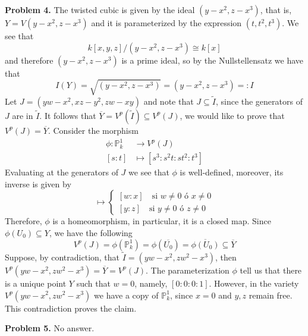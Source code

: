 \documentclass{article}
\def \P {\mathbb{P}}
\begin{document}
\vspace{5mm}
\noindent\textbf{Problem 4.} The twisted cubic is given by the ideal $(y-x^{2},z-x^{3})$, that is,
$Y=V(y-x^{2},z-x^{3})$ and it is parameterized by the expression $(t,t^{2},t^{3})$. We see that
\begin{equation*}
    k[x,y,z]/(y-x^{2},z-x^{3})\cong k[x]
\end{equation*}
and therefore $(y-x^{2},z-x^{3})$ is a prime ideal, so by the Nullstellensatz we have that
\begin{equation*}
    I(Y)=\sqrt{(y-x^{2},z-x^{3})}=(y-x^{2},z-x^{3})=:I
\end{equation*}
Let $J=(yw-x^{2},xz-y^{2},zw-xy)$ and note that $J\subseteq\widetilde{I}$, since the generators of
$J$ are in $\widetilde{I}$. It follows that $\overline{Y}=V^{p}(\widetilde{I})\subseteq V^{p}(J)$,
we would like to prove that $V^{p}(J)=\overline{Y}$. Consider the morphism
\begin{align*}
    \phi:\P_{k}^{1} &\to V^{p}(J) \\
    [s:t] &\mapsto [s^{3}:s^{2}t:st^{2}:t^{3}]
\end{align*}
Evaluating at the generators of $J$ we see that $\phi$ is well-defined, moreover, its inverse is 
given by
\begin{equation*}
    [w:x:y:z]\mapsto\begin{cases}
        [w:x] \quad \text{si $w\neq0$ ó $x\neq0$} \\
        [y:z] \quad \text{si $y\neq0$ ó $z\neq0$}
    \end{cases}
\end{equation*}
Therefore, $\phi$ is a homeomorphism, in particular, it is a closed map. Since 
$\phi(U_{0})\subseteq Y$, we have the following
\begin{equation*}
    V^{p}(J)=\phi(\P_{k}^{1})=\phi(\overline{U_{0}})=\overline{\phi(U_{0})}\subseteq\overline{Y}
\end{equation*}
Suppose, by contradiction, that $\widetilde{I}=(yw-x^{2},zw^{2}-x^{3})$, then 
$V^{p}(yw-x^{2},zw^{2}-x^{3})=\overline{Y}=V^{p}(J)$. The parameterization $\phi$ tell us that 
there is a unique point $Y$ such that $w=0$, namely, $[0:0:0:1]$. However, in the variety
$V^{p}(yw-x^{2},zw^{2}-x^{3})$ we have a copy of $\P_{k}^{1}$, since $x=0$ and $y,z$ remain free.
This contradiction proves the claim.

\vspace{5mm}
\noindent\textbf{Problem 5.} No answer.
\end{document}
